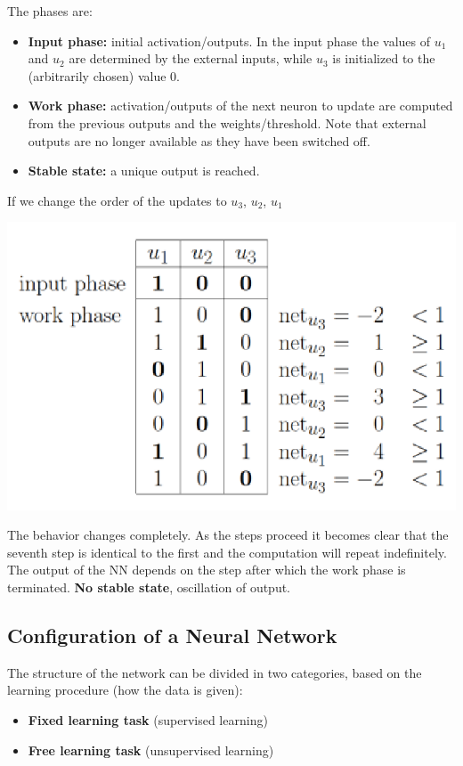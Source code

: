 \documentclass[11pt]{article}
\begin{document}
		The phases are: 
		\begin{itemize}
			\item \textbf{Input phase:} initial activation/outputs. In the input phase the values of $u_1$ and $u_2$ are determined by the external inputs, while $u_3$ is initialized to the (arbitrarily chosen) value 0.
			\item \textbf{Work phase:} activation/outputs of the next neuron to update are computed from the previous outputs and the weights/threshold. Note that external outputs are no longer available as they have been switched off.
			\item \textbf{Stable state:} a unique output is reached.
		\end{itemize}
		
		If we change the order of the updates to $u_3$, $u_2$, $u_1$
		\begin{center}
			\includegraphics[width=0.45\columnwidth]{img/NN/RNN3}
		\end{center}
		The behavior changes completely. As the steps proceed it becomes clear that the seventh step is identical to the first and the computation will repeat indefinitely. The output of the NN depends on the step after which the work phase is terminated. \textbf{No stable state}, oscillation of output.\\
		
		\newpage
		
		\subsection{Configuration of a Neural Network}
		The structure of the network can be divided in two categories, based on the learning procedure (how the data is given):
		\begin{itemize}
			\item \textbf{Fixed learning task} (supervised learning)\\
			\item \textbf{Free learning task} (unsupervised learning)\\
		\end{itemize}
		
\end{document}
